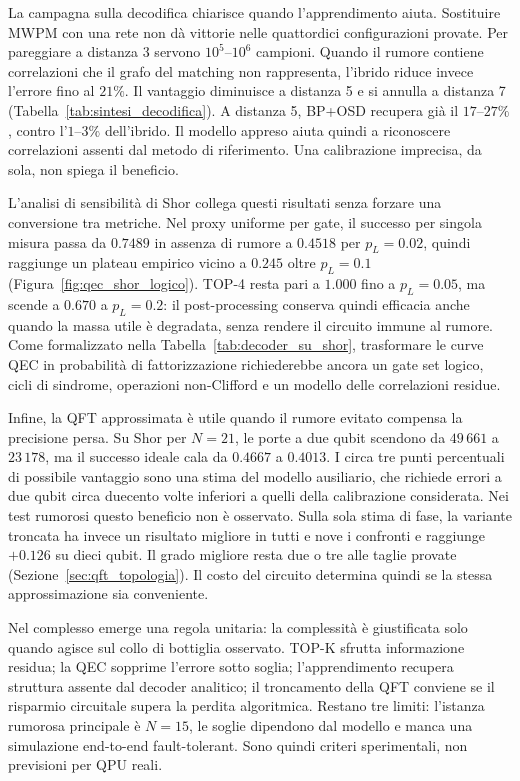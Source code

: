 \begin{onehalfspace}
La campagna sulla decodifica chiarisce quando l'apprendimento aiuta. Sostituire MWPM con una rete non dà vittorie nelle quattordici configurazioni provate. Per pareggiare a distanza 3 servono $10^5$--$10^6$ campioni. Quando il rumore contiene correlazioni che il grafo del matching non rappresenta, l'ibrido riduce invece l'errore fino al $21\%$. Il vantaggio diminuisce a distanza 5 e si annulla a distanza 7 (Tabella~\ref{tab:sintesi_decodifica}). A distanza 5, BP+OSD recupera già il $17$--$27\%$, contro l'$1$--$3\%$ dell'ibrido. Il modello appreso aiuta quindi a riconoscere correlazioni assenti dal metodo di riferimento. Una calibrazione imprecisa, da sola, non spiega il beneficio.

L'analisi di sensibilità di Shor collega questi risultati senza forzare una conversione tra
metriche. Nel proxy uniforme per gate, il successo per singola misura passa da $0.7489$ in
assenza di rumore a $0.4518$ per $p_L=0.02$, quindi raggiunge un plateau empirico vicino a
$0.245$ oltre $p_L=0.1$ (Figura~\ref{fig:qec_shor_logico}). TOP-4 resta pari a $1.000$ fino
a $p_L=0.05$, ma scende a $0.670$ a $p_L=0.2$: il post-processing conserva quindi efficacia
anche quando la massa utile è degradata, senza rendere il circuito immune al rumore. Come
formalizzato nella Tabella~\ref{tab:decoder_su_shor}, trasformare le curve QEC in probabilità
di fattorizzazione richiederebbe ancora un gate set logico, cicli di sindrome, operazioni
non-Clifford e un modello delle correlazioni residue.

Infine, la QFT approssimata è utile quando il rumore evitato compensa la precisione persa. Su Shor per $N=21$, le porte a due qubit scendono da $49\,661$ a $23\,178$, ma il successo ideale cala da $0.4667$ a $0.4013$. I circa tre punti percentuali di possibile vantaggio sono una stima del modello ausiliario, che richiede errori a due qubit circa duecento volte inferiori a quelli della calibrazione considerata. Nei test rumorosi questo beneficio non è osservato. Sulla sola stima di fase, la variante troncata ha invece un risultato migliore in tutti e nove i confronti e raggiunge $+0.126$ su dieci qubit. Il grado migliore resta due o tre alle taglie provate (Sezione~\ref{sec:qft_topologia}). Il costo del circuito determina quindi se la stessa approssimazione sia conveniente.

Nel complesso emerge una regola unitaria: la complessità è giustificata solo quando agisce sul
collo di bottiglia osservato. TOP-K sfrutta informazione residua; la QEC sopprime l'errore sotto
soglia; l'apprendimento recupera struttura assente dal decoder analitico; il troncamento della
QFT conviene se il risparmio circuitale supera la perdita algoritmica. Restano tre limiti:
l'istanza rumorosa principale è $N=15$, le soglie dipendono dal modello e manca una simulazione
end-to-end fault-tolerant. Sono quindi criteri sperimentali, non previsioni per QPU reali.

\end{onehalfspace}
